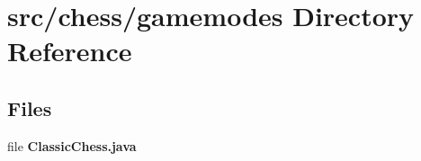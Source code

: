 \section{src/chess/gamemodes Directory Reference}
\label{dir_6748306aab44a39751336c63868f9e96}
\subsection*{Files}
\begin{DoxyCompactItemize}
\item 
file {\bf Classic\+Chess.\+java}
\end{DoxyCompactItemize}

